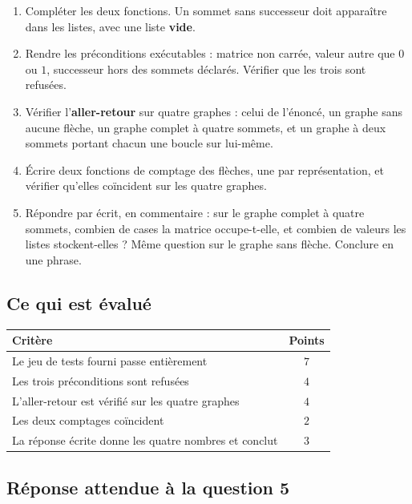 \begin{enumerate}
  \item Compléter les deux fonctions. Un sommet sans successeur doit apparaître
    dans les listes, avec une liste \textbf{vide}.

  \item Rendre les préconditions exécutables : matrice non carrée, valeur autre
    que $0$ ou $1$, successeur hors des sommets déclarés. Vérifier que les trois
    sont refusées.

  \item Vérifier l'\textbf{aller-retour} sur quatre graphes : celui de l'énoncé,
    un graphe sans aucune flèche, un graphe complet à quatre sommets, et un
    graphe à deux sommets portant chacun une boucle sur lui-même.

  \item Écrire deux fonctions de comptage des flèches, une par représentation,
    et vérifier qu'elles coïncident sur les quatre graphes.

  \item Répondre par écrit, en commentaire : sur le graphe complet à quatre
    sommets, combien de cases la matrice occupe-t-elle, et combien de valeurs
    les listes stockent-elles ? Même question sur le graphe sans flèche.
    Conclure en une phrase.
\end{enumerate}

\subsection*{Ce qui est évalué}

\begin{center}
\begin{tabular}{|l|c|}
\hline
\textbf{Critère} & \textbf{Points} \\
\hline
Le jeu de tests fourni passe entièrement & $7$ \\
\hline
Les trois préconditions sont refusées & $4$ \\
\hline
L'aller-retour est vérifié sur les quatre graphes & $4$ \\
\hline
Les deux comptages coïncident & $2$ \\
\hline
La réponse écrite donne les quatre nombres et conclut & $3$ \\
\hline
\end{tabular}
\end{center}

\subsection*{Réponse attendue à la question 5}

